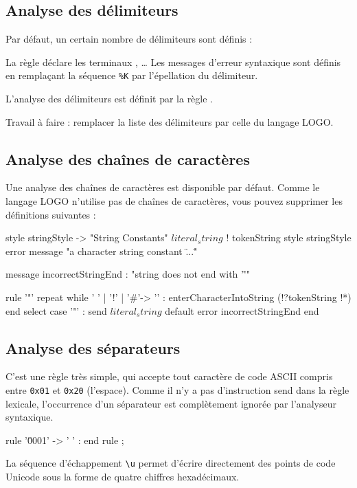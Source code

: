 \subsection{Analyse des délimiteurs}
Par défaut, un certain nombre de délimiteurs sont définis :


La règle  déclare les terminaux \galgas{$:$}, \galgas{$,$}… Les messages d'erreur syntaxique sont définis en remplaçant la séquence \texttt{\%K} par l’épellation du délimiteur.

L'analyse des délimiteurs est définit par la règle .

Travail à faire : remplacer la liste des délimiteurs par celle du langage LOGO.

\subsection{Analyse des chaînes de caractères}
Une analyse des chaînes de caractères est disponible par défaut. Comme le langage LOGO n’utilise pas de chaînes de caractères, vous pouvez supprimer les définitions suivantes :

\begin{galgascode}
style stringStyle -> "String Constants"
$literal_string$ ! tokenString style stringStyle %
                   error message "a character string constant \"...\""

message incorrectStringEnd : "string does not end with '\"'"

rule '"' {
  repeat
  while ' ' | '!' | '#'-> '\uFFFD' :
    enterCharacterIntoString (!?tokenString !*)
  end
  select
  case '"' :
    send $literal_string$
  default
    error incorrectStringEnd
  end
}
\end{galgascode}

\subsection{Analyse des séparateurs}
C'est une règle très simple, qui accepte tout caractère de code ASCII compris entre \texttt{0x01} et \texttt{0x20} (l'espace). Comme il n'y a pas d'instruction send dans la règle lexicale, l'occurrence d'un séparateur est complètement ignorée par l'analyseur syntaxique.
\begin{galgascode}
rule '\u0001' -> ' ' :
end rule ;
\end{galgascode}
La séquence d'échappement \texttt{\textbackslash u} permet d'écrire directement des points de code Unicode sous la forme de quatre chiffres hexadécimaux.

